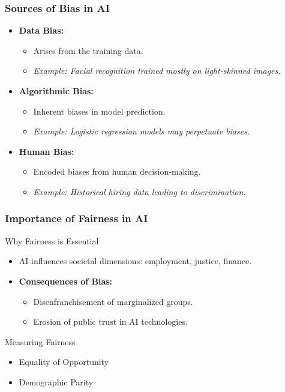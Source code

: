 \documentclass[aspectratio=169]{beamer}
\begin{document}
\begin{frame}[fragile]
    \frametitle{Sources of Bias in AI}
    \begin{itemize}
        \item \textbf{Data Bias:}
            \begin{itemize}
                \item Arises from the training data.
                \item \textit{Example: Facial recognition trained mostly on light-skinned images.}
            \end{itemize}
        \item \textbf{Algorithmic Bias:}
            \begin{itemize}
                \item Inherent biases in model prediction.
                \item \textit{Example: Logistic regression models may perpetuate biases.}
            \end{itemize}
        \item \textbf{Human Bias:}
            \begin{itemize}
                \item Encoded biases from human decision-making.
                \item \textit{Example: Historical hiring data leading to discrimination.}
            \end{itemize}
    \end{itemize}
\end{frame}

\begin{frame}[fragile]
    \frametitle{Importance of Fairness in AI}
    \begin{block}{Why Fairness is Essential}
        \begin{itemize}
            \item AI influences societal dimensions: employment, justice, finance.
            \item \textbf{Consequences of Bias:}
                \begin{itemize}
                    \item Disenfranchisement of marginalized groups.
                    \item Erosion of public trust in AI technologies.
                \end{itemize}
        \end{itemize}
    \end{block}
    \begin{block}{Measuring Fairness}
        \begin{itemize}
            \item Equality of Opportunity
            \item Demographic Parity
        \end{itemize}
    \end{block}
\end{frame}
\end{document}
